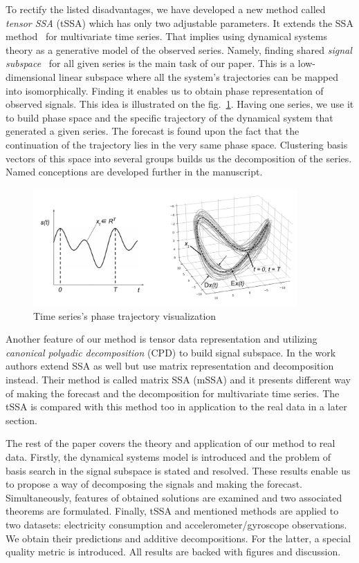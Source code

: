 \documentclass[referee, pdflatex, sn-mathphys-num]{sn-jnl}
\theoremstyle{definition}
\theoremstyle{plain}
\begin{document}
	To rectify the listed disadvantages, we have developed a new method called \emph{tensor SSA} (tSSA) which has only two adjustable parameters. It extends the SSA method~\cite{ecfb9dc578be43ae9ee8fc88b8ff9151} for multivariate time series. That implies using dynamical systems theory as a generative model of the observed series. Namely, finding shared \emph{signal subspace}~\cite{1572261550523548160, ignatov2016human} for all given series is the main task of our paper. This is a low-dimensional linear subspace where all the system's trajectories can be mapped into isomorphically. Finding it enables us to obtain phase representation of observed signals. This idea is illustrated on the fig.~\ref{pic:phase_traj}. Having one series, we use it to build phase space and the specific trajectory of the dynamical system that generated a given series. The forecast is found upon the fact that the continuation of the trajectory lies in the very same phase space. Clustering basis vectors of this space into several groups builds us the decomposition of the series. Named conceptions are developed further in the manuscript.
	
	\begin{figure}[h]
		\centering
		\includegraphics[width=0.9\textwidth, keepaspectratio]{phase_traj.png}
		\caption{Time series's phase trajectory visualization }\label{pic:phase_traj}
	\end{figure}
	
	Another feature of our method is tensor data representation and utilizing \emph{canonical polyadic decomposition} (CPD) to build signal subspace. In the work~\cite{mSSA_overview} authors extend SSA as well but use matrix representation and decomposition instead. Their method is called matrix SSA (mSSA) and it presents different way of making the forecast and the decomposition for multivariate time series. The tSSA is compared with this method too in application to the real data in a later section.
	
	The rest of the paper covers the theory and application of our method to real data. Firstly, the dynamical systems model is introduced and the problem of basis search in the signal subspace is stated and resolved. These results enable us to propose a way of decomposing the signals and making the forecast. Simultaneously, features of obtained solutions are examined and two associated theorems are formulated. Finally, tSSA and mentioned methods are applied to two datasets: electricity consumption and accelerometer/gyroscope observations. We obtain their predictions and additive decompositions. For the latter, a special quality metric is introduced. All results are backed with figures and discussion.
	
\end{document}
